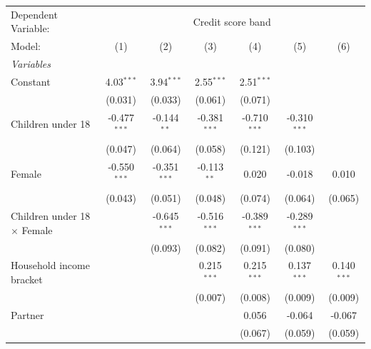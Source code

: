 
\begingroup
\centering
\begin{tabular}{lcccccc}
   \tabularnewline \midrule \midrule
   Dependent Variable: & \multicolumn{6}{c}{Credit score band}\\
   Model:                              & (1)            & (2)            & (3)            & (4)            & (5)            & (6)\\  
   \midrule
   \emph{Variables}\\
   Constant                            & 4.03$^{***}$   & 3.94$^{***}$   & 2.55$^{***}$   & 2.51$^{***}$   &                &   \\   
                                       & (0.031)        & (0.033)        & (0.061)        & (0.071)        &                &   \\   
   Children under 18                   & -0.477$^{***}$ & -0.144$^{**}$  & -0.381$^{***}$ & -0.710$^{***}$ & -0.310$^{***}$ &   \\   
                                       & (0.047)        & (0.064)        & (0.058)        & (0.121)        & (0.103)        &   \\   
   Female                              & -0.550$^{***}$ & -0.351$^{***}$ & -0.113$^{**}$  & 0.020          & -0.018         & 0.010\\   
                                       & (0.043)        & (0.051)        & (0.048)        & (0.074)        & (0.064)        & (0.065)\\   
   Children under 18 $\times$ Female   &                & -0.645$^{***}$ & -0.516$^{***}$ & -0.389$^{***}$ & -0.289$^{***}$ &   \\   
                                       &                & (0.093)        & (0.082)        & (0.091)        & (0.080)        &   \\   
   Household income bracket            &                &                & 0.215$^{***}$  & 0.215$^{***}$  & 0.137$^{***}$  & 0.140$^{***}$\\   
                                       &                &                & (0.007)        & (0.008)        & (0.009)        & (0.009)\\   
   Partner                             &                &                &                & 0.056          & -0.064         & -0.067\\   
                                       &                &                &                & (0.067)        & (0.059)        & (0.059)\\   

\end{tabular}

